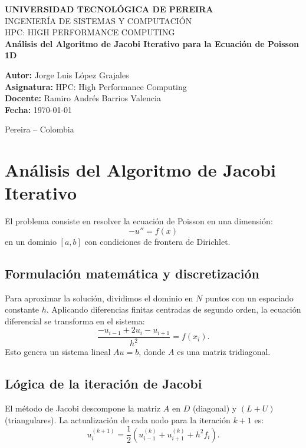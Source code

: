 \documentclass[11pt,a4paper]{article}
\begin{document}
\begin{titlepage}
\centering
{\Large \textbf{UNIVERSIDAD TECNOLÓGICA DE PEREIRA}}\\[0.8cm]
{\large INGENIERÍA DE SISTEMAS Y COMPUTACIÓN}\\[0.5cm]
{\large HPC: HIGH PERFORMANCE COMPUTING}\\[2.0cm]
{\LARGE \textbf{Análisis del Algoritmo de Jacobi Iterativo para la Ecuación de Poisson 1D}}\\[0.8cm]

\begin{flushleft}
\textbf{Autor:} Jorge Luis López Grajales\\[0.4cm]
\textbf{Asignatura:} HPC: High Performance Computing\\[0.4cm]
\textbf{Docente:} Ramiro Andrés Barrios Valencia\\[0.4cm]
\textbf{Fecha:} \today
\end{flushleft}
\vfill
{\large Pereira -- Colombia}
\end{titlepage}

\section{Análisis del Algoritmo de Jacobi Iterativo}

El problema consiste en resolver la ecuación de Poisson en una dimensión:
\[
-u'' = f(x)
\]
en un dominio $[a,b]$ con condiciones de frontera de Dirichlet.

\subsection{Formulación matemática y discretización}

Para aproximar la solución, dividimos el dominio en $N$ puntos con un espaciado constante $h$.  
Aplicando diferencias finitas centradas de segundo orden, la ecuación diferencial se transforma en el sistema:
\[
\frac{-u_{i-1} + 2u_i - u_{i+1}}{h^2} = f(x_i).
\]
Esto genera un sistema lineal $Au=b$, donde $A$ es una matriz tridiagonal.

\subsection{Lógica de la iteración de Jacobi}

El método de Jacobi descompone la matriz $A$ en $D$ (diagonal) y $(L+U)$ (triangulares).  
La actualización de cada nodo para la iteración $k+1$ es:
\[
u_i^{(k+1)} = \frac{1}{2}\left(u_{i-1}^{(k)} + u_{i+1}^{(k)} + h^2 f_i\right).
\]
\end{document}
